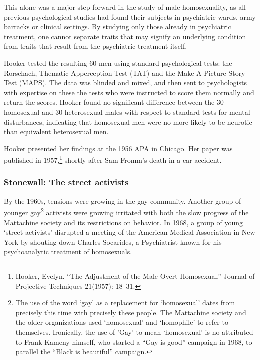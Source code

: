 This alone was a major step forward in the study of male homosexuality, as all previous psychological studies had found their subjects in psychiatric wards, army barracks or clinical settings. By studying only those already in psychiatric treatment, one cannot separate traits that may signify an underlying condition from traits that result from the psychiatric treatment itself.

Hooker tested the resulting 60 men using standard psychological tests: the Rorschach, Thematic Apperception Test (TAT) and the Make-A-Picture-Story Test (MAPS). The data was blinded and mixed, and then sent to psychologists with expertise on these the tests who were instructed to score them normally and return the scores. Hooker found no significant difference between the 30 homosexual and 30 heterosexual males with respect to standard tests for mental disturbances, indicating that homosexual men were no more likely to be neurotic than equivalent heterosexual men.

Hooker presented her findings at the 1956 APA in Chicago. Her paper was published in 1957,\footnote{Hooker, Evelyn. ``The Adjustment of the Male Overt Homosexual.'' Journal of Projective Techniques 21(1957): 18--31.} shortly after Sam Fromm's death in a car accident.

\subsubsection{Stonewall: The street activists}
\label{stonewall:thestreetactivists}

By the 1960s, tensions were growing in the gay community. Another group of younger gay\footnote{The use of the word `gay' as a replacement for `homosexual' dates from precisely this time with precisely these people. The Mattachine society and the older organizations used `homosexual' and `homophile' to refer to themselves. Ironically, the use of ’Gay' to mean ‘homosexual’ is no attributed to Frank Kameny himself, who started a “Gay is good” campaign in 1968, to parallel the “Black is beautiful” campaign.} activists were growing irritated with both the slow progress of the Mattachine society and its restrictions on behavior. In 1968, a group of young `street-activists' disrupted a meeting of the American Medical Association in New York by shouting down Charles Socarides, a Psychiatrist known for his psychoanalytic treatment of homosexuals.

